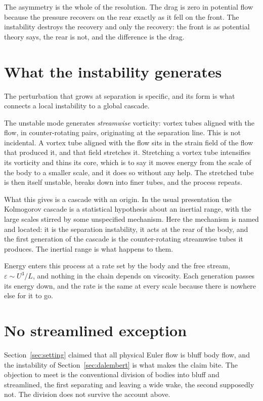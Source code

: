\documentclass[11pt]{article}
\newcommand{\eps}{\varepsilon}
\begin{document}
The asymmetry is the whole of the resolution. The drag is zero in potential flow because the
pressure recovers on the rear exactly as it fell on the front. The instability destroys the recovery
and only the recovery: the front is as potential theory says, the rear is not, and the difference is
the drag.

\section{What the instability generates}\label{sec:vorticity}

The perturbation that grows at separation is specific, and its form is what connects a local
instability to a global cascade.

The unstable mode generates \emph{streamwise} vorticity: vortex tubes aligned with the flow, in
counter-rotating pairs, originating at the separation line. This is not incidental. A vortex tube
aligned with the flow sits in the strain field of the flow that produced it, and that field stretches
it. Stretching a vortex tube intensifies its vorticity and thins its core, which is to say it moves
energy from the scale of the body to a smaller scale, and it does so without any help. The stretched
tube is then itself unstable, breaks down into finer tubes, and the process repeats.

What this gives is a cascade with an origin. In the usual presentation the Kolmogorov cascade is a
statistical hypothesis about an inertial range, with the large scales stirred by some unspecified
mechanism. Here the mechanism is named and located: it is the separation instability, it acts at the
rear of the body, and the first generation of the cascade is the counter-rotating streamwise tubes
it produces. The inertial range is what happens to them.

Energy enters this process at a rate set by the body and the free stream, $\eps\sim U^3/L$, and
nothing in the chain depends on viscosity. Each generation passes its energy down, and the rate is
the same at every scale because there is nowhere else for it to go.

\section{No streamlined exception}\label{sec:bluff}

Section~\ref{sec:setting} claimed that all physical Euler flow is bluff body flow, and the
instability of Section~\ref{sec:dalembert} is what makes the claim bite. The objection to meet is
the conventional division of bodies into bluff and streamlined, the first separating and leaving a
wide wake, the second supposedly not. The division does not survive the account above.
\end{document}
